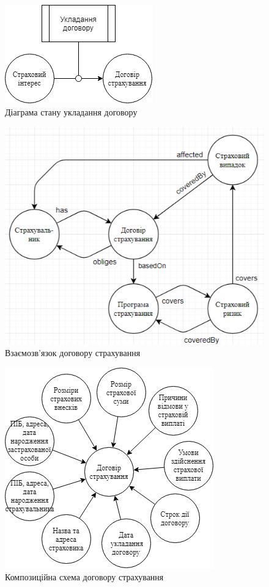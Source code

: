 \begin{figure}[H]
    \centering
        \includegraphics{idef_state}
    \caption{Діаграма стану укладання договору}
    \label{fig:idef_state}
\end{figure}

\begin{figure}[H]
    \centering
        \includegraphics[width=0.7\linewidth]{idef_relation}
    \caption{Взаємозв'язок договору страхування}
    \label{fig:idef_relation}
\end{figure}

\begin{figure}[H]
    \centering
        \includegraphics[width=0.6\linewidth]{idef_composition}
    \caption{Композиційна схема договору страхування}
    \label{fig:idef_composition}
\end{figure}

